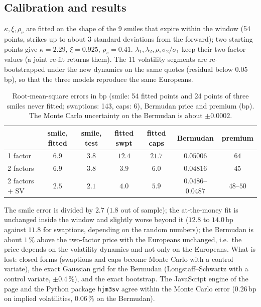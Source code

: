 \documentclass[11pt,a4paper]{article}
\theoremstyle{definition}
\theoremstyle{remark}
\begin{document}
\subsection{Calibration and results}
$\kappa,\xi,\rho_v$ are fitted on the shape of the 9 smiles that expire within the window (54 points, strikes up to about 3 standard deviations from the forward); two starting points give
$\kappa=2.29$, $\xi=0.925$, $\rho_v=0.41$. $\lambda_1,\lambda_2,\rho,\sigma_2/\sigma_1$ keep their two-factor values (a joint re-fit returns them). The 11 volatility segments are re-bootstrapped
under the new dynamics on the same quotes (residual below $0.05\,$bp), so that the three models reproduce the same Europeans.

\begin{table}[ht]\centering\small
\begin{tabular}{lcccccc}\toprule
 & smile, fitted & smile, test & fitted swpt & fitted caps & Bermudan & premium\\\midrule
1 factor & $6.9$ & $3.8$ & $12.4$ & $21.7$ & $0.05006$ & $64$\\
2 factors & $6.9$ & $3.8$ & $3.9$ & $6.0$ & $0.04816$ & $45$\\
2 factors $+$ SV & $\mathbf{2.5}$ & $\mathbf{2.1}$ & $4.0$ & $5.9$ & $0.0486$--$0.0487$ & $48$--$50$\\\bottomrule
\end{tabular}
\caption{Root-mean-square errors in bp (smile: 54 fitted points and 24 points of three smiles never fitted; swaptions: 143, caps: 6), Bermudan price and premium (bp).
The Monte Carlo uncertainty on the Bermudan is about $\pm0.0002$.}\label{tab:sv}
\end{table}

The smile error is divided by $2.7$ ($1.8$ out of sample); the at-the-money fit is unchanged inside the window and slightly worse beyond it ($12.8$ to $14.0\,$bp against $11.8$ for swaptions,
depending on the random numbers); the Bermudan is about $1\,\%$ above the two-factor price with the Europeans unchanged, i.e.\ the price depends on the volatility dynamics and not
only on the Europeans. What is lost: closed forms (swaptions and caps become Monte Carlo with a control variate), the exact Gaussian grid for the Bermudan (Longstaff--Schwartz with a control variate,
$\pm0.4\,\%$), and the exact bootstrap. The JavaScript engine of the page and the Python package \texttt{hjm3sv} agree within the Monte Carlo error ($0.26\,$bp on implied volatilities, $0.06\,\%$ on the Bermudan).
\end{document}
